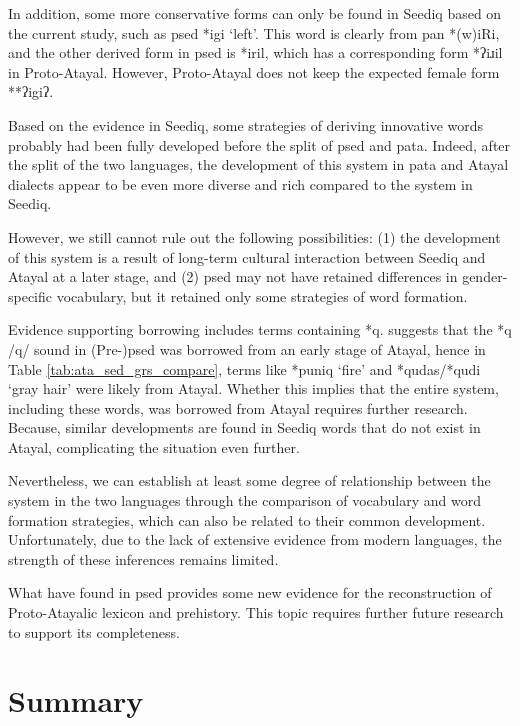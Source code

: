 In addition, some more conservative forms can only be found in Seediq based on the current study, such as \acl{psed} *igi `left'. This word is clearly from \acs{pan} *(w)iRi, and the other derived form in \acl{psed} is *iril, which has a corresponding form *ʔiɹil in Proto-Atayal. However, Proto-Atayal does not keep the expected female form **ʔigiʔ. 

Based on the evidence in Seediq, some strategies of deriving innovative words probably had been fully developed before the split of \acl{psed} and \acl{pata}. Indeed, after the split of the two languages, the development of this system in \acl{pata} and Atayal dialects appear to be even more diverse and rich compared to the system in Seediq. 

However, we still cannot rule out the following possibilities: (1) the development of this system is a result of long-term cultural interaction between Seediq and Atayal at a later stage, and (2) \acl{psed} may not have retained differences in gender-specific vocabulary, but it retained only some strategies of word formation. 

Evidence supporting borrowing includes terms containing *q. \textcite{song2024sedq} suggests that the *q /q/ sound in (Pre-)\acl{psed} was borrowed from an early stage of Atayal, hence in Table \ref{tab:ata_sed_grs_compare}, terms like *puniq `fire' and *qudas/*qudi `gray hair' were likely from Atayal. Whether this implies that the entire system, including these words, was borrowed from Atayal requires further research. Because, similar developments are found in Seediq words that do not exist in Atayal, complicating the situation even further.

Nevertheless, we can establish at least some degree of relationship between the system in the two languages through the comparison of vocabulary and word formation strategies, which can also be related to their common development. Unfortunately, due to the lack of extensive evidence from modern languages, the strength of these inferences remains limited.

What have found in \acl{psed} provides some new evidence for the reconstruction of Proto-Atayalic lexicon and prehistory. This topic requires further future research to support its completeness.

\section{Summary}


